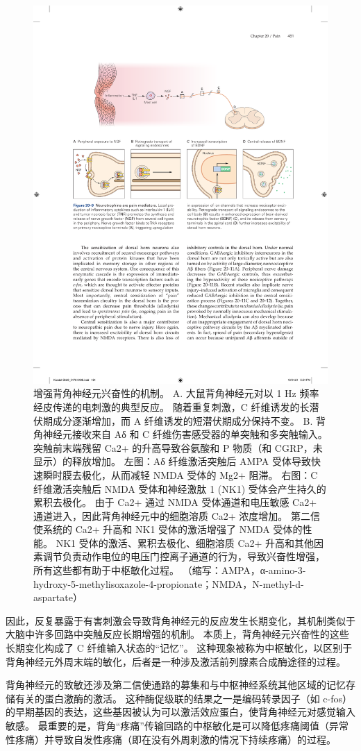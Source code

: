 \begin{figure}[htbp]
	\centering
	\includegraphics[width=0.7\linewidth]{chap20/fig_20_9}
	\caption{增强背角神经元兴奋性的机制。
		A. 大鼠背角神经元对以 1 Hz 频率经皮传递的电刺激的典型反应。 随着重复刺激，C 纤维诱发的长潜伏期成分逐渐增加，而 A 纤维诱发的短潜伏期成分保持不变。
		B. 背角神经元接收来自 Aδ 和 C 纤维伤害感受器的单突触和多突触输入。
		突触前末端残留 Ca2+ 的升高导致谷氨酸和 P 物质（和 CGRP，未显示）的释放增加。
		左图：Aδ 纤维激活突触后 AMPA 受体导致快速瞬时膜去极化，从而减轻 NMDA 受体的 Mg2+ 阻滞。
		右图：C 纤维激活突触后 NMDA 受体和神经激肽 1 (NK1) 受体会产生持久的累积去极化。
		由于 Ca2+ 通过 NMDA 受体通道和电压敏感 Ca2+ 通道进入，因此背角神经元中的细胞溶质 Ca2+ 浓度增加。
		第二信使系统的 Ca2+ 升高和 NK1 受体的激活增强了 NMDA 受体的性能。
		NK1 受体的激活、累积去极化、细胞溶质 Ca2+ 升高和其他因素调节负责动作电位的电压门控离子通道的行为，导致兴奋性增强，所有这些都有助于中枢敏化过程。 （缩写：AMPA，α-amino-3-hydroxy-5-methylisoxazole-4-propionate；NMDA，N-methyl-d-aspartate）}
	\label{fig:20_10}
\end{figure}


因此，反复暴露于有害刺激会导致背角神经元的反应发生长期变化，其机制类似于大脑中许多回路中突触反应长期增强的机制。
本质上，背角神经元兴奋性的这些长期变化构成了 C 纤维输入状态的“记忆”。
这种现象被称为中枢敏化，以区别于背角神经元外周末端的敏化，后者是一种涉及激活前列腺素合成酶途径的过程。


背角神经元的致敏还涉及第二信使通路的募集和与中枢神经系统其他区域的记忆存储有关的蛋白激酶的激活。
这种酶促级联的结果之一是编码转录因子（如 c-fos）的早期基因的表达，这些基因被认为可以激活效应蛋白，使背角神经元对感觉输入敏感。
最重要的是，背角“疼痛”传输回路的中枢敏化是可以降低疼痛阈值（异常性疼痛）并导致自发性疼痛（即在没有外周刺激的情况下持续疼痛）的过程。



